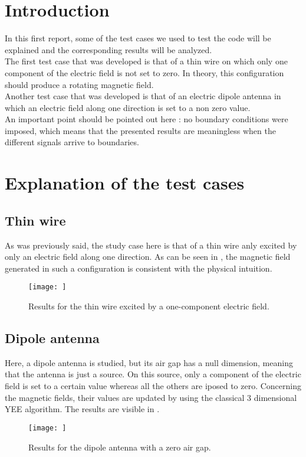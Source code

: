 \documentclass[12 pt]{report}
\begin{document}
\section{Introduction}
In this first report, some of the test cases we used to test the code will be explained and the corresponding results will be analyzed. \\
The first test case that was developed is that of a thin wire on which only one component of the electric field is not set to zero. In theory, this configuration should produce a rotating magnetic field. \\
Another test case that was developed is that of an electric dipole antenna in which an electric field along one direction is set to a non zero value. \\
An important point should be pointed out here : no boundary conditions were imposed, which means that the presented results are meaningless when the different signals arrive to boundaries.

\section{Explanation of the test cases}
\subsection{Thin wire}
As was previously said, the study case here is that of a thin wire anly excited by only an electric field along one direction. As can be seen in , the magnetic field generated in such a configuration is consistent with the physical intuition.
%
\begin{figure}
	\centering
	\texttt{[image: ]}
	\caption{Results for the thin wire excited by a one-component electric field.}
	\label{fig:THINWIRE}
\end{figure}
%


\subsection{Dipole antenna}
Here, a dipole antenna is studied, but its air gap has a null dimension, meaning that the antenna is just a source. On this source, only a component of the electric field is set to a certain value whereas all the others are iposed to zero. Concerning the magnetic fields, their values are updated by using the classical 3 dimensional YEE algorithm. The results are visible in .
%
\begin{figure}
	\centering
	\texttt{[image: ]}
	\caption{Results for the dipole antenna with a zero air gap.}
	\label{fig:DIPOLEANTENNA}
\end{figure}
%
\end{document}
